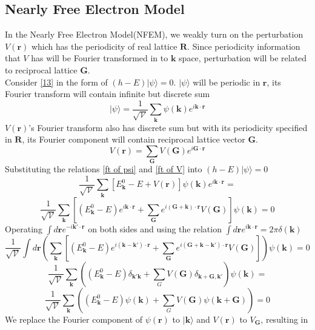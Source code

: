 \documentclass{article}
\begin{document}
\subsection*{Nearly Free Electron Model}
In the Nearly Free Electron Model(NFEM), we weakly turn on the perturbation $V(\mathbf{r})$ which has the periodicity of real lattice $\mathbf{R}$. Since periodicity information that $V$ has will be Fourier transformed in to $\mathbf{k}$ space, perturbation will be related to reciprocal lattice $\mathbf{G}$.\\
Consider \eqref{13} in the form of $(h-E)|\psi\rangle=0$. $|\psi\rangle$ will be periodic in $\mathbf{r}$, its Fourier transform will contain infinite but discrete sum
\begin{equation}
	|\psi\rangle=\frac{1}{\sqrt{\mathcal{V}}}\sum_{\mathbf{k}}\psi(\mathbf{k})e^{i\mathbf{k\cdot\mathbf{r}}}\label{ft of psi}
\end{equation}
$V(\mathbf{r})$'s Fourier transform also has discrete sum but with its periodicity specified in $\mathbf{R}$, its Fourier component will contain reciprocal lattice vector $\mathbf{G}$.
\begin{equation}
	V(\mathbf{r})=\sum_{\mathbf{G}}V(\mathbf{G})e^{i\mathbf{G}\cdot\mathbf{r}}\label{ft of V}
\end{equation}
Substituting the relations \eqref{ft of psi} and \eqref{ft of V} into $(h-E)|\psi\rangle=0$
$$\frac{1}{\sqrt{\mathcal{V}}}\sum_{\mathbf{k}}\left[E_{\mathbf{k}}^{0}-E+V(\mathbf{r})\right]\psi(\mathbf{k})e^{i\mathbf{k}\cdot\mathbf{r}}=$$
$$\frac{1}{\sqrt{\mathcal{V}}}\sum_{\mathbf{k}}\left[(E_{\mathbf{k}}^{0}-E)e^{i\mathbf{k}\cdot\mathbf{r}}+\sum_{\mathbf{G}}e^{i(\mathbf{G}+\mathbf{k})\cdot\mathbf{r}}V(\mathbf{G})\right]\psi(\mathbf{k})=0$$
Operating $\int d\mathbf{r}e^{-i\mathbf{k'}\cdot\mathbf{r}}$ on both sides and using the relation $\int d\mathbf{r}e^{i\mathbf{k}\cdot\mathbf{r}}=2\pi\delta(\mathbf{k})$
$$\frac{1}{\sqrt{\mathcal{V}}}\int d\mathbf{r}\left(\sum_{\mathbf{k}}\left[(E_{\mathbf{k}}^{0}-E)e^{i(\mathbf{k}-\mathbf{k'})\cdot\mathbf{r}}+\sum_{\mathbf{G}}e^{i(\mathbf{G}+\mathbf{k}-\mathbf{k'})\cdot\mathbf{r}}V(\mathbf{G})\right]\right)\psi(\mathbf{k})=0$$
$$\frac{1}{\sqrt{\mathcal{V}}}\sum_{\mathbf{k}}\left((E_{\mathbf{k}}^{0}-E)\delta_{\mathbf{k'}\mathbf{k}}+\sum_{G}V(\mathbf{G})\delta_{\mathbf{k+G},\mathbf{k'}}\right)\psi(\mathbf{k})=$$
$$\frac{1}{\sqrt{\mathcal{V}}}\sum_{\mathbf{k}}\left((E_{\mathbf{k}}^{0}-E)\psi(\mathbf{k})+\sum_{G}V(\mathbf{G})\psi(\mathbf{k+G})\right)=0$$
We replace the Fourier component of $\psi(\mathbf{r})$ to $|\mathbf{k}\rangle$  and $V(\mathbf{r})$ to $V_{\mathbf{G}}$, resulting in
\end{document}
